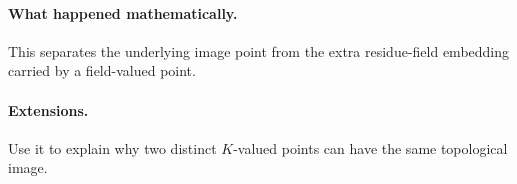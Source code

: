 \paragraph{What happened mathematically.}
This separates the underlying image point from the extra residue-field embedding carried by a field-valued point.

\paragraph{Extensions.}
Use it to explain why two distinct $K$-valued points can have the same topological image.
\fi
